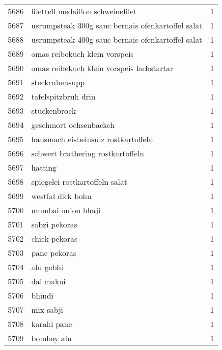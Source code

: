 \begin{tabular}{llr}
5686 &                  filettell medaillon schweinefilet &      1 \\
5687 &  usrumpsteak 300g sauc bernais ofenkartoffel salat &      1 \\
5688 &  usrumpsteak 400g sauc bernais ofenkartoffel salat &      1 \\
5689 &                      omas reibekuch klein vorspeis &      1 \\
5690 &          omas reibekuch klein vorspeis lachstartar &      1 \\
5691 &                                     steckrubensupp &      1 \\
5692 &                                tafelspitzbruh drin &      1 \\
5693 &                                       stuckenbrock &      1 \\
5694 &                             geschmort ochsenbackch &      1 \\
5695 &                hausmach eisbeinsulz rostkartoffeln &      1 \\
5696 &                  schwert brathering rostkartoffeln &      1 \\
5697 &                                            hatting &      1 \\
5698 &                     spiegelei rostkartoffeln salat &      1 \\
5699 &                                  westfal dick bohn &      1 \\
5700 &                                 mumbai onion bhaji &      1 \\
5701 &                                      sabzi pekoras &      1 \\
5702 &                                      chick pekoras &      1 \\
5703 &                                       pane pekoras &      1 \\
5704 &                                          alu gobhi &      1 \\
5705 &                                          dal makni &      1 \\
5706 &                                             bhindi &      1 \\
5707 &                                          mix sabji &      1 \\
5708 &                                        karahi pane &      1 \\
5709 &                                         bombay alu &      1 \\

\end{tabular}
